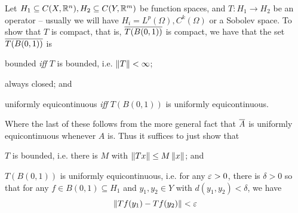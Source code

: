 \documentclass[11pt]{article}
\begin{document}
Let $H_1 \subseteq C(X, \mathbb{R}^n), H_2 \subseteq C(Y, \mathbb{R}^m)$ be function spaces, and $T : H_1 \to H_2$ be an operator -- usually we will have $H_i = L^p(\Omega), C^k(\Omega)$ or a Sobolev space. To show that $T$ is compact, that is, $\overline{T(B(0, 1))}$ is compact, we have that the set $\overline{T(B(0, 1))}$ is
\begin{enum}
    \item bounded \emph{iff} $T$ is bounded, i.e. $\left\| T \right\| < \infty$;
    \item always closed; and
    \item uniformly equicontinuous \emph{iff} $T(B(0, 1))$ is uniformly equicontinuous.
\end{enum}
Where the last of these follows from the more general fact that $\overline{A}$ is uniformly equicontinuous whenever $A$ is. Thus it suffices to just show that
\begin{enum}
    \item $T$ is bounded, i.e. there is $M$ with $\left\| Tx \right\| \leq M\left\| x \right\|$; and
    \item $T(B(0, 1))$ is uniformly equicontinuous, i.e. for any $\varepsilon > 0$, there is $\delta > 0$ so that for any $f \in B(0, 1) \subseteq H_1$ and $y_1, y_2 \in Y$ with $d(y_1, y_2) < \delta$, we have
    $$
        \left\| Tf(y_1) - Tf(y_2) \right\| < \varepsilon
    $$
\end{enum}
\end{document}
